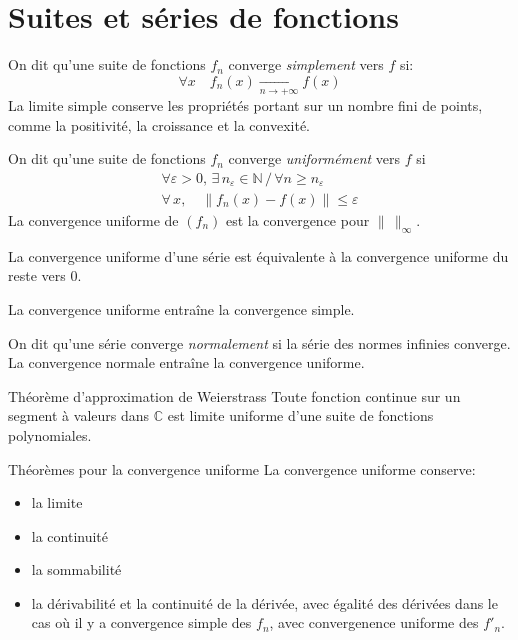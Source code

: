 \documentclass[french, a4paper, 10pt, twocolumn]{article}
\newcommand{\N}{\mathbb{N}}   %
\newcommand{\C}{\mathbb{C}}   %
\begin{document}
\section{Suites et séries de fonctions}
\begin{definition}
  On dit qu'une suite de fonctions \(f_{n}\) converge \emph{simplement} vers \(f\) si:
  \[\forall x\quad f_{n}(x)\xrightarrow[n\rightarrow +\infty]{} f(x)\]
  La limite simple conserve les propriétés portant sur un nombre fini de points, comme la positivité, la croissance et la convexité.
\end{definition}

\begin{definition}
  On dit qu'une suite de fonctions \(f_{n}\) converge \emph{uniformément} vers \(f\) si
  \begin{align*}
    \forall \varepsilon >0,\,\exists\, n_{\varepsilon}\in\N \,\slash\, \forall n\geqslant n_{\varepsilon} \\
    \forall\, x,\quad \left\lVert f_{n}(x)-f(x)\right\rVert \leqslant \varepsilon
  \end{align*}
  La convergence uniforme de \((f_{n})\) est la convergence pour \(\lVert\,\rVert_{\infty}\).

  La convergence uniforme d'une série est équivalente à la convergence uniforme du reste vers \(0\).

  La convergence uniforme entraîne la convergence simple.
\end{definition}

\begin{definition}
  On dit qu'une série converge \emph{normalement} si la série des normes infinies converge.
  La convergence normale entraîne la convergence uniforme.
\end{definition}

\begin{theoreme}{Théorème d'approximation de Weierstrass}
  Toute fonction continue sur un segment à valeurs dans \(\C\) est limite uniforme d'une suite de fonctions polynomiales.
\end{theoreme}

\begin{theoreme}{Théorèmes pour la convergence uniforme}
  La convergence uniforme conserve:
  \begin{itemize}[label=\(\bullet\)]
    \item la limite
    \item la continuité
    \item la sommabilité
    \item la dérivabilité et la continuité de la dérivée, avec égalité des dérivées dans le cas où il y a convergence simple des $f_{n}$, avec convergenence uniforme des $f'_{n}$.
  \end{itemize}
\end{theoreme}
\end{document}
